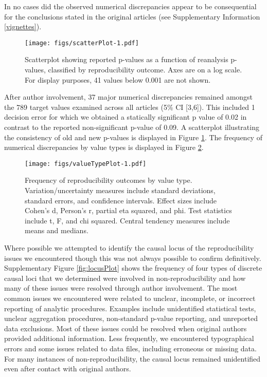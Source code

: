 \documentclass[english,,man,floatsintext]{apa6}
\begin{document}
In no cases did the observed numerical discrepancies appear to be consequential for the conclusions stated in the original articles (see Supplementary Information \ref{vignettes}).

\begin{figure}
\centering
\texttt{[image: figs/scatterPlot-1.pdf]}
\caption{\label{fig:scatterPlot}Scatterplot showing reported p-values as a function of reanalysis p-values, classified by reproducibility outcome. Axes are on a log scale. For display purposes, 41 values below 0.001 are not shown.}
\end{figure}

After author involvement, 37 major numerical discrepancies remained amongst the 789 target values examined across all articles (5\% CI {[}3,6{]}). This included 1 decision error for which we obtained a statically significant p value of 0.02 in contrast to the reported non-significant p-value of 0.09. A scatterplot illustrating the consistency of old and new p-values is displayed in Figure \ref{fig:scatterPlot}. The frequency of numerical discrepancies by value types is displayed in Figure \ref{fig:valueTypePlot}.

\begin{figure}
\centering
\texttt{[image: figs/valueTypePlot-1.pdf]}
\caption{\label{fig:valueTypePlot}Frequency of reproducibility outcomes by value type. Variation/uncertainty measures include standard deviations, standard errors, and confidence intervals. Effect sizes include Cohen's d, Person's r, partial eta squared, and phi. Test statistics include t, F, and chi squared. Central tendency measures include means and medians.}
\end{figure}

Where possible we attempted to identify the causal locus of the reproducibility issues we encountered though this was not always possible to confirm definitively. Supplementary Figure \ref{fig:locusPlot} shows the frequency of four types of discrete causal loci that we determined were involved in non-reproducibility and how many of these issues were resolved through author involvement. The most common issues we encountered were related to unclear, incomplete, or incorrect reporting of analytic procedures. Examples include unidentified statistical tests, unclear aggregation procedures, non-standard p-value reporting, and unreported data exclusions. Most of these issues could be resolved when original authors provided additional information. Less frequently, we encountered typographical errors and some issues related to data files, including erroneous or missing data. For many instances of non-reproducibility, the causal locus remained unidentified even after contact with original authors.
\end{document}
